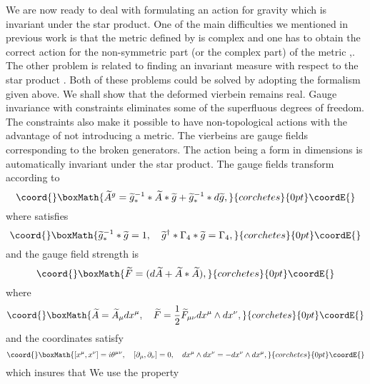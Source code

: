 \documentclass[a4paper,a4paper]{article}
\begin{document}
We are now ready to deal with formulating an action for gravity which is
invariant under the star product. One of the main difficulties we mentioned in
previous work is that the metric defined by \coordHE{} is complex \cite{complex} and one has to obtain the correct action for the
non-symmetric part (or the complex part) of the metric \cite{ES}%
,\cite{schrod}. The other problem is related to finding an invariant measure
with respect to the star product \cite{NK}. Both of these problems could be
solved by adopting the formalism given above. We shall show that the deformed
vierbein \coordHE{} remains real. Gauge invariance with
constraints eliminates some of the superfluous degrees of freedom. The
constraints also make it possible to have non-topological actions with the
advantage of not introducing a metric. The vierbeins are gauge fields
corresponding to the broken generators. The action being a \coordHE{} form in \coordHE{}
dimensions is automatically invariant under the star product. The gauge fields
transform according to
\[\coord{}\boxMath{
\widetilde{A}^{g}=\widetilde{g}_{\ast}^{-1}\ast\widetilde{A}\ast\widetilde
{g}+\widetilde{g}_{\ast}^{-1}\ast d\widetilde{g},
}{corchetes}{0pt}\coordE{}\]
where \coordHE{} satisfies
\[\coord{}\boxMath{
\widetilde{g}_{\ast}^{-1}\ast\widetilde{g}=1,\quad\widetilde{g}^{\dagger}%
\ast\Gamma_{4}\ast\widetilde{g}=\Gamma_{4},
}{corchetes}{0pt}\coordE{}\]
and the gauge field strength is
\[\coord{}\boxMath{
\widetilde{F}=(d\widetilde{A}+\widetilde{A}\ast\widetilde{A}),
}{corchetes}{0pt}\coordE{}\]
where
\[\coord{}\boxMath{
\widetilde{A}=\widetilde{A}_{\mu}dx^{\mu},\quad\widetilde{F}=\frac{1}%
{2}\widetilde{F}_{\mu\nu}dx^{\mu}\wedge dx^{\nu},
}{corchetes}{0pt}\coordE{}\]
and the coordinates \coordHE{} satisfy
\[\coord{}\boxMath{
\left[  x^{\mu},x^{\nu}\right]  =i\theta^{\mu\nu},\quad\left[  \partial_{\mu
},\partial_{\nu}\right]  =0,\quad dx^{\mu}\wedge dx^{\nu}=-dx^{\nu}\wedge
dx^{\mu},
}{corchetes}{0pt}\coordE{}\]
which insures that \coordHE{} We use the property
\end{document}

